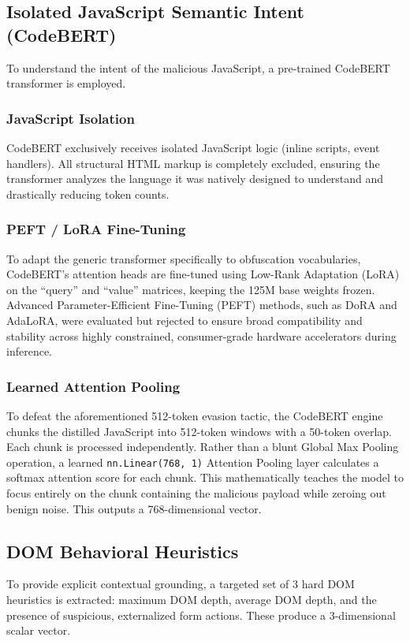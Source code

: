 \documentclass[conference]{IEEEtran}
\begin{document}
\subsection{Isolated JavaScript Semantic Intent (CodeBERT)}
To understand the intent of the malicious JavaScript, a pre-trained CodeBERT transformer \cite{codebert} is employed. 
\subsubsection{JavaScript Isolation}
CodeBERT exclusively receives isolated JavaScript logic (inline scripts, event handlers). All structural HTML markup is completely excluded, ensuring the transformer analyzes the language it was natively designed to understand and drastically reducing token counts.
\subsubsection{PEFT / LoRA Fine-Tuning}
To adapt the generic transformer specifically to obfuscation vocabularies, CodeBERT's attention heads are fine-tuned using Low-Rank Adaptation (LoRA) on the ``query'' and ``value'' matrices, keeping the 125M base weights frozen. Advanced Parameter-Efficient Fine-Tuning (PEFT) methods, such as DoRA and AdaLoRA, were evaluated but rejected to ensure broad compatibility and stability across highly constrained, consumer-grade hardware accelerators during inference.
\subsubsection{Learned Attention Pooling}
To defeat the aforementioned 512-token evasion tactic, the CodeBERT engine chunks the distilled JavaScript into 512-token windows with a 50-token overlap. Each chunk is processed independently. Rather than a blunt Global Max Pooling operation, a learned \texttt{nn.Linear(768, 1)} Attention Pooling layer \cite{vaswani} calculates a softmax attention score for each chunk. This mathematically teaches the model to focus entirely on the chunk containing the malicious payload while zeroing out benign noise. This outputs a 768-dimensional vector.

\subsection{DOM Behavioral Heuristics}
To provide explicit contextual grounding, a targeted set of 3 hard DOM heuristics is extracted: maximum DOM depth, average DOM depth, and the presence of suspicious, externalized form actions. These produce a 3-dimensional scalar vector.
\end{document}
